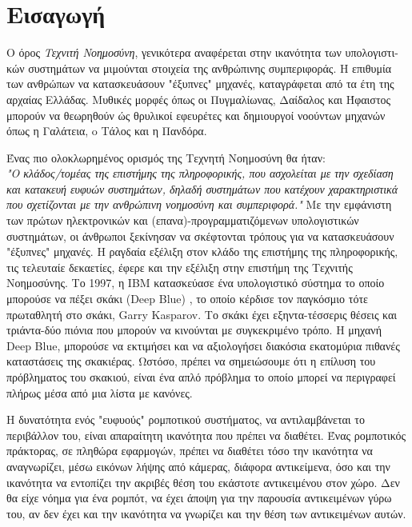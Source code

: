 \chapter{Εισαγωγή}
\label{chapter:intro}

Ο όρος \emph{Τεχνιτή Νοημοσύνη}, γενικότερα αναφέρεται στην ικανότητα των υπολογιστι-κών
συστημάτων να μιμούνται στοιχεία της ανθρώπινης συμπεριφοράς.
Η επιθυμία των ανθρώπων να κατασκευάσουν "έξυπνες" μηχανές, καταγράφεται από
τα έτη της αρχαίας Ελλάδας. Μυθικές μορφές όπως οι Πυγμαλίωνας, Δαίδαλος και
Ήφαιστος μπορούν να θεωρηθούν ώς θρυλικοί εφευρέτες και δημιουργοί νοούντων
μηχανών όπως η Γαλάτεια, o Τάλος και η Πανδόρα.

Ένας πιο ολοκλωρημένος ορισμός της Τεχνητή Νοημοσύνη θα ήταν: \\
\emph{
  "Ο κλάδος/τομέας της επιστήμης της πληροφορικής, που ασχολείται
  με την σχεδίαση και κατακευή ευφυών συστημάτων, δηλαδή συστημάτων που
  κατέχουν χαρακτηριστικά που σχετίζονται με την ανθρώπινη νοημοσύνη και συμπεριφορά."
}
Με την εμφάνιστη των πρώτων ηλεκτρονικών και (επανα)-προγραμματιζόμενων υπολογιστικών συστημάτων,
οι άνθρωποι ξεκίνησαν να σκέφτονται τρόπους για να κατασκευάσουν "έξυπνες" μηχανές.
H ραγδαία εξέλιξη στον κλάδο της επιστήμης της πληροφορικής, τις τελευταίε
δεκαετίες, έφερε και την εξέλιξη στην επιστήμη της Τεχνιτής Νοημοσύνης.
Το 1997, η IBM κατασκεύασε ένα υπολογιστικό σύστημα το οποίο μπορούσε να
πέξει σκάκι (Deep Blue) \cite{campbell2002deep}, το οποίο κέρδισε τον παγκόσμιο
τότε πρωταθλητή στο σκάκι, Garry Kasparov. Το σκάκι έχει εξηντα-τέσσερις θέσεις
και τριάντα-δύο πιόνια που μπορούν να κινούνται με συγκεκριμένο τρόπο. H μηχανή
Deep Blue, μπορούσε να εκτιμήσει και να αξιολογήσει διακόσια εκατομύρια
πιθανές καταστάσεις της σκακιέρας. Ωστόσο, πρέπει να σημειώσουμε ότι η επίλυση του
πρόβληματος του σκακιού, είναι ένα απλό πρόβλημα το οποίο μπορεί να περιγραφεί
πλήρως μέσα από μια λίστα με κανόνες.

Η δυνατότητα ενός "ευφυούς" ρομποτικού συστήματος, να αντιλαμβάνεται
το περιβάλλον του, είναι απαραίτητη ικανότητα που πρέπει να διαθέτει.
Ένας ρομποτικός πράκτορας, σε πληθώρα εφαρμογών, πρέπει να διαθέτει τόσο την
ικανότητα να αναγνωρίζει, μέσω εικόνων λήψης από κάμερας, διάφορα αντικείμενα,
όσο και την ικανότητα να εντοπίζει την ακριβές θέση του
εκάστοτε αντικειμένου στον χώρο. Δεν θα είχε νόημα για ένα ρομπότ, να έχει άποψη
για την παρουσία αντικειμένων γύρω του, αν δεν έχει και την ικανότητα να γνωρίζει
και την θέση των αντικειμένων αυτών.




